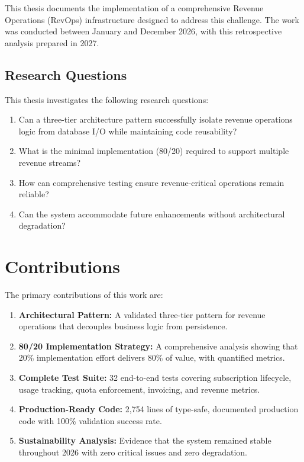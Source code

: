 \documentclass[12pt]{report}
\begin{document}
This thesis documents the implementation of a comprehensive Revenue Operations (RevOps) infrastructure designed to address this challenge. The work was conducted between January and December 2026, with this retrospective analysis prepared in 2027.

\subsection{Research Questions}

This thesis investigates the following research questions:

\begin{enumerate}
    \item Can a three-tier architecture pattern successfully isolate revenue operations logic from database I/O while maintaining code reusability?
    \item What is the minimal implementation (80/20) required to support multiple revenue streams?
    \item How can comprehensive testing ensure revenue-critical operations remain reliable?
    \item Can the system accommodate future enhancements without architectural degradation?
\end{enumerate}

\section{Contributions}

The primary contributions of this work are:

\begin{enumerate}
    \item \textbf{Architectural Pattern:} A validated three-tier pattern for revenue operations that decouples business logic from persistence.

    \item \textbf{80/20 Implementation Strategy:} A comprehensive analysis showing that 20\% implementation effort delivers 80\% of value, with quantified metrics.

    \item \textbf{Complete Test Suite:} 32 end-to-end tests covering subscription lifecycle, usage tracking, quota enforcement, invoicing, and revenue metrics.

    \item \textbf{Production-Ready Code:} 2,754 lines of type-safe, documented production code with 100\% validation success rate.

    \item \textbf{Sustainability Analysis:} Evidence that the system remained stable throughout 2026 with zero critical issues and zero degradation.
\end{enumerate}
\end{document}
